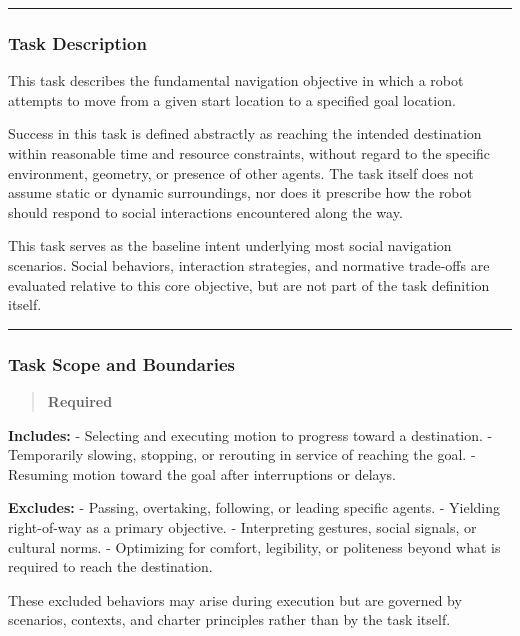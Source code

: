 \documentclass[utf8]{frontiers_suppmat} %
\begin{document}
\begin{center}\rule{0.5\linewidth}{0.5pt}\end{center}

\subsubsection{Task Description}\label{task-description}

This task describes the fundamental navigation objective in which a
robot attempts to move from a given start location to a specified goal
location.

Success in this task is defined abstractly as reaching the intended
destination within reasonable time and resource constraints, without
regard to the specific environment, geometry, or presence of other
agents. The task itself does not assume static or dynamic surroundings,
nor does it prescribe how the robot should respond to social
interactions encountered along the way.

This task serves as the baseline intent underlying most social
navigation scenarios. Social behaviors, interaction strategies, and
normative trade-offs are evaluated relative to this core objective, but
are not part of the task definition itself.

\begin{center}\rule{0.5\linewidth}{0.5pt}\end{center}

\subsubsection{Task Scope and
Boundaries}\label{task-scope-and-boundaries}

\begin{quote}
\textbf{Required}
\end{quote}

\textbf{Includes:} - Selecting and executing motion to progress toward a
destination. - Temporarily slowing, stopping, or rerouting in service of
reaching the goal. - Resuming motion toward the goal after interruptions
or delays.

\textbf{Excludes:} - Passing, overtaking, following, or leading specific
agents. - Yielding right-of-way as a primary objective. - Interpreting
gestures, social signals, or cultural norms. - Optimizing for comfort,
legibility, or politeness beyond what is required to reach the
destination.

These excluded behaviors may arise during execution but are governed by
scenarios, contexts, and charter principles rather than by the task
itself.
\end{document}
